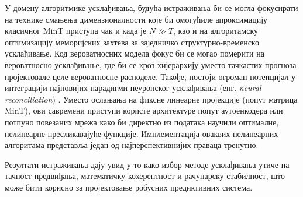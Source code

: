 \documentclass[12pt,oneside]{memoir}
\begin{document}
У домену алгоритмике усклађивања, будућа истраживања би се могла фокусирати на технике смањења димензионалности које би омогућиле апроксимацију класичног MinT приступа чак и када је $N \gg T$, као и на алгоритамску оптимизацију меморијских захтева за заједничко структурно-временско усклађивање. Код вероватносних модела фокус би се могао померити на вероватносно усклађивање, где би се кроз хијерархију уместо тачкастих прогноза пројектовале целе вероватносне расподеле. Такође, постоји огроман потенцијал у интеграцији најновијих парадигми неуронског усклађивања (енг. \textit{neural reconciliation}) \cite{mancuso2021machine}. Уместо ослањања на фиксне линеарне пројекције (попут матрица MinT), ови савремени приступи користе архитектуре попут аутоенкодера или потпуно повезаних мрежа како би директно из података научили оптималне, нелинеарне пресликавајуће функције. Имплементација оваквих нелинеарних алгоритама представља један од најперспективнијих праваца тренутно.

Резултати истраживања дају увид у то како избор методе усклађивања утиче на тачност предвиђања, математичку кохерентност и рачунарску стабилност, што може бити корисно за пројектовање робусних предиктивних система.


\literatura

\backmatter

\end{document}
